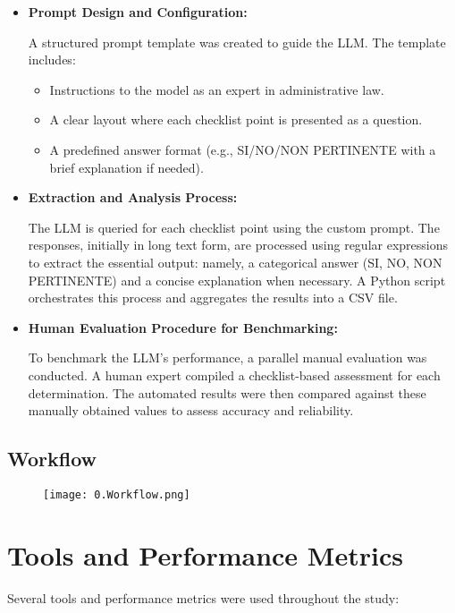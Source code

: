 \documentclass[../main.tex]{subfiles}
\begin{document}
\begin{itemize}
    \item \textbf{Prompt Design and Configuration:}
    
 A structured prompt template was created to guide the LLM. The template includes:
    \begin{itemize}
        \item Instructions to the model as an expert in administrative law.
        \item A clear layout where each checklist point is presented as a question.
        \item A predefined answer format (e.g., SI/NO/NON PERTINENTE with a brief explanation if needed).
    \end{itemize}
    \item \textbf{Extraction and Analysis Process:}
    
 The LLM is queried for each checklist point using the custom prompt. The responses, initially in long text form, are processed using regular expressions to extract the essential output: namely, a categorical answer (SI, NO, NON PERTINENTE) and a concise explanation when necessary. A Python script orchestrates this process and aggregates the results into a CSV file.
    \item \textbf{Human Evaluation Procedure for Benchmarking:}
    
 To benchmark the LLM's performance, a parallel manual evaluation was conducted. A human expert compiled a checklist-based assessment for each determination. The automated results were then compared against these manually obtained values to assess accuracy and reliability.
\end{itemize}

 \subsection*{Workflow}
 \begin{figure}[H]
    \texttt{[image: 0.Workflow.png]}
\end{figure}

\section*{Tools and Performance Metrics}
Several tools and performance metrics were used throughout the study:
\end{document}
